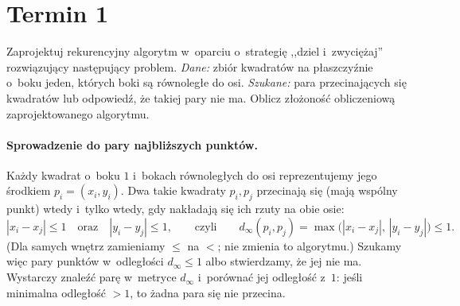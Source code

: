 \section{Termin 1}

\begin{zadanie}
	Zaprojektuj rekurencyjny algorytm w~oparciu o~strategię ,,dziel i~zwyciężaj''
	rozwiązujący następujący problem. \emph{Dane:} zbiór kwadratów na płaszczyźnie
	o~boku jeden, których boki są równoległe do osi. \emph{Szukane:} para
	przecinających się kwadratów lub odpowiedź, że takiej pary nie ma. Oblicz
	złożoność obliczeniową zaprojektowanego algorytmu.
\end{zadanie}

\paragraph{Sprowadzenie do pary najbliższych punktów.}
Każdy kwadrat o~boku $1$ i~bokach równoległych do osi reprezentujemy jego
środkiem $p_i=(x_i,y_i)$. Dwa takie kwadraty $p_i,p_j$ przecinają się (mają
wspólny punkt) wtedy i~tylko wtedy, gdy nakładają się ich rzuty na obie osie:
\[
	|x_i-x_j|\leq 1 \quad\text{oraz}\quad |y_i-y_j|\leq 1,
	\qquad\text{czyli}\qquad
	d_\infty(p_i,p_j)=\max\big(|x_i-x_j|,\,|y_i-y_j|\big)\leq 1.
\]
(Dla samych wnętrz zamieniamy $\leq$ na $<$; nie zmienia to algorytmu.) Szukamy
więc pary punktów w~odległości $d_\infty\leq 1$ albo stwierdzamy, że jej nie ma.
Wystarczy znaleźć parę  w~metryce $d_\infty$ i~porównać jej
odległość z~$1$: jeśli minimalna odległość $>1$, to żadna para się nie przecina.

